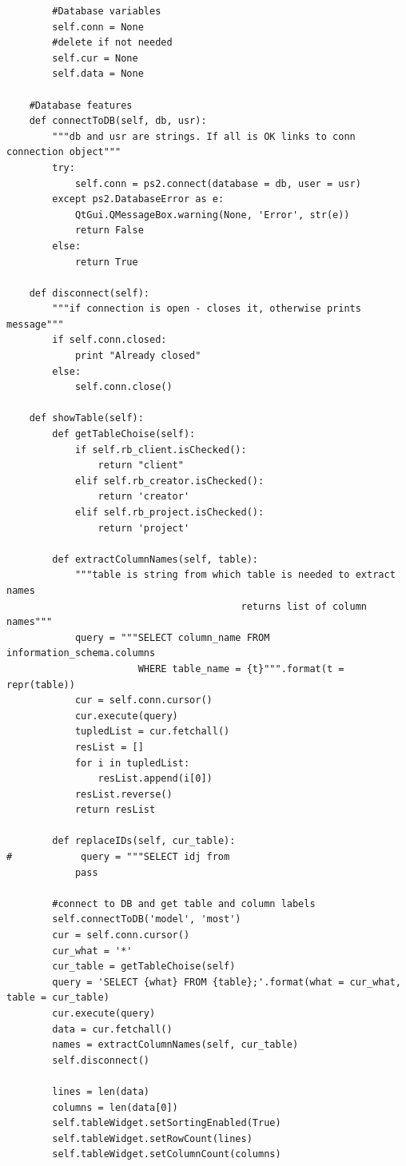 \documentclass[a4paper, 12pt, titlepage]{article}
\begin{document}
\begin{otherlanguage}{russian}
\begin{lstlisting}
        #Database variables
        self.conn = None
        #delete if not needed
        self.cur = None
        self.data = None

    #Database features
    def connectToDB(self, db, usr):
        """db and usr are strings. If all is OK links to conn connection object"""
        try:
            self.conn = ps2.connect(database = db, user = usr)
        except ps2.DatabaseError as e:
            QtGui.QMessageBox.warning(None, 'Error', str(e))
            return False
        else:
            return True

    def disconnect(self):
        """if connection is open - closes it, otherwise prints message"""
        if self.conn.closed:
            print "Already closed"
        else:
            self.conn.close()
        
    def showTable(self):
        def getTableChoise(self):
            if self.rb_client.isChecked():
                return "client"
            elif self.rb_creator.isChecked():
                return 'creator'
            elif self.rb_project.isChecked():
                return 'project'

        def extractColumnNames(self, table):
            """table is string from which table is needed to extract names
                                         returns list of column names"""
            query = """SELECT column_name FROM information_schema.columns 
                       WHERE table_name = {t}""".format(t = repr(table))
            cur = self.conn.cursor()
            cur.execute(query)
            tupledList = cur.fetchall()
            resList = []
            for i in tupledList:
                resList.append(i[0])
            resList.reverse()
            return resList
        
        def replaceIDs(self, cur_table):
#            query = """SELECT idj from 
            pass

        #connect to DB and get table and column labels
        self.connectToDB('model', 'most')
        cur = self.conn.cursor()
        cur_what = '*'
        cur_table = getTableChoise(self)
        query = 'SELECT {what} FROM {table};'.format(what = cur_what, table = cur_table)
        cur.execute(query)
        data = cur.fetchall()
        names = extractColumnNames(self, cur_table)
        self.disconnect()

        lines = len(data)
        columns = len(data[0])
        self.tableWidget.setSortingEnabled(True)
        self.tableWidget.setRowCount(lines)
        self.tableWidget.setColumnCount(columns)


\end{lstlisting}
\end{otherlanguage}
\end{document}
